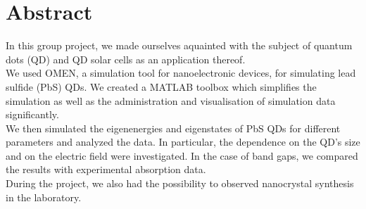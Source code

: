 \chapter*{Abstract}

In this group project, we made ourselves aquainted with the subject of quantum dots (QD) and QD solar cells as an  application thereof. \\

We used OMEN, a simulation tool for nanoelectronic devices, for simulating lead sulfide (PbS) QDs. We created a MATLAB toolbox which simplifies the simulation as well as the administration and visualisation of simulation data significantly.\\

We then simulated the eigenenergies and eigenstates of PbS QDs for different parameters and analyzed the data. In particular, the dependence on the QD's size and on the electric field were investigated. In the case of band gaps, we compared the results with experimental absorption data.\\

During the project, we also had the possibility to observed nanocrystal synthesis in the laboratory.